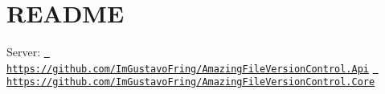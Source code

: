 \chapter{README}
\hypertarget{md__r_e_a_d_m_e}{}\label{md__r_e_a_d_m_e}
Server\+: \href{https://github.com/ImGustavoFring/AmazingFileVersionControl.Api}{\texttt{ https\+://github.\+com/\+Im\+Gustavo\+Fring/\+Amazing\+File\+Version\+Control.\+Api}} \href{https://github.com/ImGustavoFring/AmazingFileVersionControl.Core}{\texttt{ https\+://github.\+com/\+Im\+Gustavo\+Fring/\+Amazing\+File\+Version\+Control.\+Core}} 
